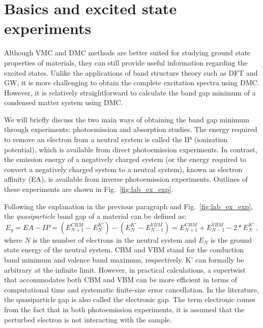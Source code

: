 \section{Basics and excited state experiments}
Although VMC and DMC methods are better suited for studying ground state properties of materials, they can still provide useful information regarding the excited states. 
Unlike the applications of band structure theory such as DFT and GW, it is more challenging to obtain the complete excitation spectra using DMC. 
However, it is relatively straightforward to calculate the band gap minimum of a condensed matter system using DMC. 

We will briefly discuss the two main ways of obtaining the band gap minimum through experiments: photoemission and absorption studies.  
The energy required to remove an electron from a neutral system is called the IP (ionization potential), which is available from direct photoemission experiments. 
In contrast, the emission energy of a negatively charged system (or the energy required to convert a negatively charged system to a neutral system), known as electron affinity (EA), is available from inverse photoemission experiments. 
Outlines of these experiments are shown in Fig.~\ref{fig:lab_ex_exp}. 

Following the explanation in the previous paragraph and Fig.~\ref{fig:lab_ex_exp}, the \textit{quasiparticle} band gap of a material can be defined as:
\begin{equation}
	E_g=EA-IP=(E_{N+1}^{CBM}-E_{N}^{K'})-(E_{N}^{K'}-E_{N-1}^{VBM})=E_{N+1}^{CBM}+E_{N-1}^{VBM}-2*E_{N}^{K'}\label{eq:qp}\:,
\end{equation}
where $N$ is the number of electrons in the neutral system and $E_{N}$ is the ground state energy of the neutral system. 
CBM and VBM stand for the conduction band minimum and valence band maximum, respectively. K' can formally be arbitrary at the infinite limit.
However, in practical calculations, a supertwist that accommodates both CBM and VBM can be more efficient in terms of computational time and systematic finite-size error cancellation. 
In the literature, the quasiparticle gap is also called the electronic gap. 
The term electronic comes from the fact that in both photoemission experiments, it is assumed that the perturbed electron is not interacting with the sample. 

